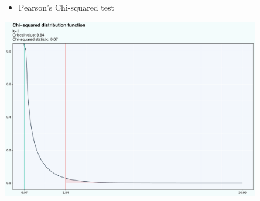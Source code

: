 \documentclass[
  ignorenonframetext,
]{beamer}
\providecommand{\tightlist}{%
  \setlength{\itemsep}{0pt}\setlength{\parskip}{0pt}}\usepackage{longtable,booktabs,array}
\begin{document}
\begin{frame}{}
\label{section-8}
\begin{itemize}
\tightlist
\item
  Pearson's Chi-squared test
\end{itemize}

\begin{center}
\includegraphics[width=0.85\textwidth,height=\textheight]{006_comparing_groups_statistical_tests_files/figure-beamer/unnamed-chunk-9-1.pdf}
\end{center}
\end{frame}
\end{document}
